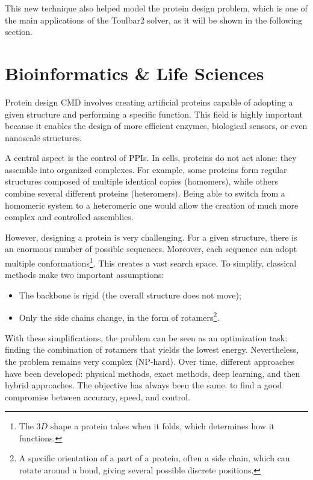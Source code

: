 \documentclass[runningheads]{llncs}
\begin{document}
This new technique also helped model the protein design problem, which is one of the main applications of the Toulbar2 solver, as it will be shown in the following section.


\section{Bioinformatics \& Life Sciences}

Protein design \ac{CMD} involves creating artificial proteins capable of adopting a given structure and performing a specific function. This field is highly important because it enables the design of more efficient enzymes, biological sensors, or even nanoscale structures.

A central aspect is the control of \acp{PPI}. In cells, proteins do not act alone: they assemble into organized complexes. For example, some proteins form regular structures composed of multiple identical copies (homomers), while others combine several different proteins (heteromers). Being able to switch from a homomeric system to a heteromeric one would allow the creation of much more complex and controlled assemblies.

However, designing a protein is very challenging. For a given structure, there is an enormous number of possible sequences. Moreover, each sequence can adopt multiple conformations\footnote{The $3D$ shape a protein takes when it folds, which determines how it functions.}. This creates a vast search space.
To simplify, classical methods make two important assumptions:

\begin{itemize}
    \item The backbone is rigid (the overall structure does not move);
    \item Only the side chains change, in the form of rotamers\footnote{A specific orientation of a part of a protein, often a side chain, which can rotate around a bond, giving several possible discrete positions.}.
\end{itemize}

With these simplifications, the problem can be seen as an optimization task: finding the combination of rotamers that yields the lowest energy. Nevertheless, the problem remains very complex (NP-hard).
Over time, different approaches have been developed: physical methods, exact methods, deep learning, and then hybrid approaches. The objective has always been the same: to find a good compromise between accuracy, speed, and control.
\end{document}
